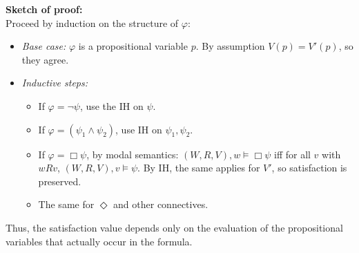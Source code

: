 \documentclass[11pt]{article}
\begin{document}
    \textbf{Sketch of proof:}\\
    Proceed by induction on the structure of $\varphi$:
    \begin{itemize}
        \item \emph{Base case:} $\varphi$ is a propositional variable $p$. By assumption $V(p) = V'(p)$, so they agree.
        \item \emph{Inductive steps:}
        \begin{itemize}
            \item If $\varphi = \neg \psi$, use the IH on $\psi$.
            \item If $\varphi = (\psi_1 \wedge \psi_2)$, use IH on $\psi_1, \psi_2$.
            \item If $\varphi = \Box \psi$, by modal semantics: $(W,R,V), w \models \Box \psi$ iff for all $v$ with $wRv$, $(W,R,V), v \models \psi$. By IH, the same applies for $V'$, so satisfaction is preserved.
            \item The same for $\Diamond$ and other connectives.
        \end{itemize}
    \end{itemize}
    Thus, the satisfaction value depends only on the evaluation of the propositional variables that actually occur in the formula.
\end{document}
